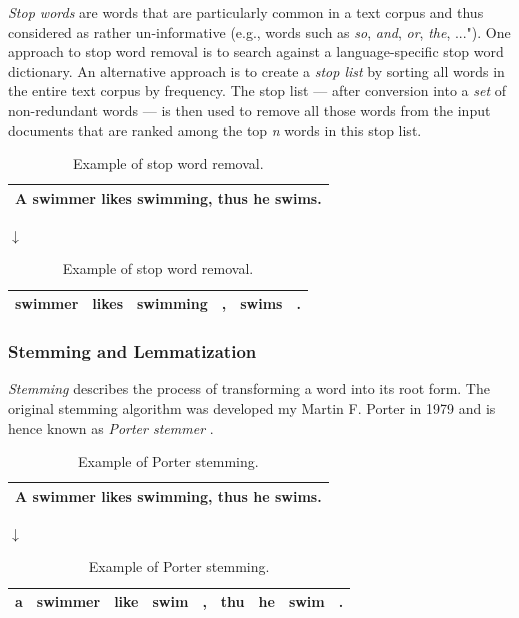\documentclass{article}
\begin{document}
\emph{Stop words} are words that are particularly common in a text corpus and thus considered as rather un-informative (e.g., words such as \emph{so}, \emph{and}, \emph{or}, \emph{the}, ..."). One approach to stop word removal is to search against a language-specific stop word dictionary. An alternative approach is to create a  \emph{stop list} by sorting all words in the entire text corpus by frequency. The stop list --- after conversion into a \emph{set} of non-redundant words --- is then used to remove all those words from the input documents that are ranked among the top \emph{n} words in this stop list.

\begin{table}[H]
\caption{Example of stop word removal.}
\begin{center}
\begin{tabular}{ | c | }
\hline
A swimmer likes swimming, thus he swims. \\ \hline
\end{tabular}

$\downarrow$

\begin{tabular}{ | c | c | c |  c | c | c | }
\hline
swimmer & likes & swimming & , &  swims &. \\ \hline
\end{tabular}
\end{center}
\end{table}


\subsubsection{Stemming and Lemmatization} 
\label{sec:stemming_and_lemmatization}

\emph{Stemming} describes the process of transforming a word into its root form. The original stemming algorithm was developed my Martin F. Porter in 1979 and is hence known as \emph{Porter stemmer} \cite{porter1980algorithm}. 

\begin{table}[H]
\caption{Example of Porter stemming.}
\begin{center}
\begin{tabular}{ | c | }
\hline
A swimmer likes swimming, thus he swims. \\ \hline
\end{tabular}

$\downarrow$

\begin{tabular}{ | c | c | c |  c | c | c | c | c | c | }
\hline
a & swimmer &  like & swim & , & thu & he & swim & .\\ \hline
\end{tabular}
\end{center}
\end{table}
\end{document}
